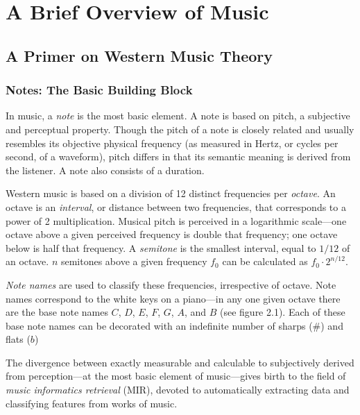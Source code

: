 \chapter{A Brief Overview of Music}

\section{A Primer on Western Music Theory}

\subsection{Notes: The Basic Building Block}

In music, a \textit{note} is the most basic element. A note is based on pitch, a subjective and perceptual property. Though the pitch of a note is closely related and usually resembles its objective physical frequency (as measured in Hertz, or cycles per second, of a waveform), pitch differs in that its semantic meaning is derived from the listener. A note also consists of a duration.

Western music is based on a division of 12 distinct frequencies per \textit{octave}. An octave is an \textit{interval}, or distance between two frequencies, that corresponds to a power of 2 multiplication. Musical pitch is perceived in a logarithmic scale---one octave above a given perceived frequency is double that frequency; one octave below is half that frequency. A \textit{semitone} is the smallest interval, equal to $1/12$ of an octave. $n$ semitones above a given frequency $f_0$ can be calculated as $f_0 \cdot 2^{n/12}$.

\textit{Note names} are used to classify these frequencies, irrespective of octave. Note names correspond to the white keys on a piano---in any one given octave there are the base note names $C$, $D$, $E$, $F$, $G$, $A$, and $B$ (see figure 2.1). Each of these base note names can be decorated with an indefinite number of sharps ($\#$) and flats ($b$)

The divergence between exactly measurable and calculable to subjectively derived from perception---at the most basic element of music---gives birth to the field of \textit{music informatics retrieval} (MIR), devoted to automatically extracting data and classifying features from works of music.